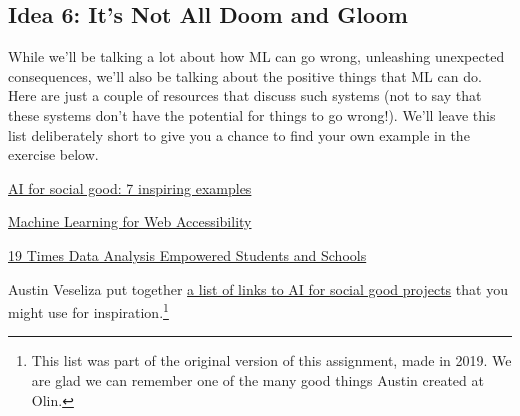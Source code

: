 \documentclass[assignment01_Solutions]{subfiles}
\begin{document}
\subsection*{Idea 6: It's Not All Doom and Gloom}
While we'll be talking a lot about how ML can go wrong, unleashing unexpected consequences, we'll also be talking about the positive things that ML can do.  Here are just a couple of resources that discuss such systems (not to say that these systems don't have the potential for things to go wrong!).  We'll leave this list deliberately short to give you a chance to find your own example in the exercise below.

\bi
\item \href{https://www.springboard.com/blog/ai-for-good/}{AI for social good: 7 inspiring examples}
\item \href{https://medium.com/myplanet-musings/making-the-web-more-accessible-using-machine-learning-8a32eaafdb3a}{Machine Learning for Web Accessibility}
\item \href{https://fpf.org/wp-content/uploads/2016/03/Final_19Times-Data_Mar2016-1.pdf}{19 Times Data Analysis Empowered Students and Schools}
\item Austin Veseliza put together \href{https://www.notion.so/ML-for-Good-c0cc352c88b04e719c187c8e4a6f5887}{a list of links to AI for social good projects} that you might use for inspiration.\footnote{This list was part of the original version of this assignment, made in 2019. We are glad we can remember one of the many good things Austin created at Olin.}
\ei


\end{document}
